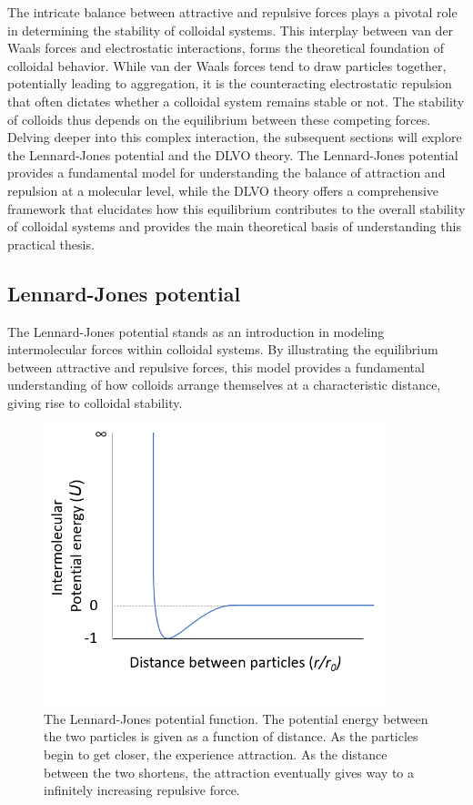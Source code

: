 The intricate balance between attractive and repulsive forces plays a pivotal role in determining the stability of colloidal systems. This interplay between van der Waals forces and electrostatic interactions, forms the theoretical foundation of colloidal behavior. While van der Waals forces tend to draw particles together, potentially leading to aggregation, it is the counteracting electrostatic repulsion that often dictates whether a colloidal system remains stable or not. The stability of colloids thus depends on the equilibrium between these competing forces. Delving deeper into this complex interaction, the subsequent sections will explore the Lennard-Jones potential and the DLVO theory. The Lennard-Jones potential provides a fundamental model for understanding the balance of attraction and repulsion at a molecular level, while the DLVO theory offers a comprehensive framework that elucidates how this equilibrium contributes to the overall stability of colloidal systems and provides the main theoretical basis of understanding this practical thesis.

\subsection{Lennard-Jones potential} %

The Lennard-Jones potential stands as an introduction in modeling intermolecular forces within colloidal systems. By illustrating the equilibrium between attractive and repulsive forces, this model provides a fundamental understanding of how colloids arrange themselves at a characteristic distance, giving rise to colloidal stability.

\begin{figure}[h!!]     %
        \begin{center}
          \includegraphics[width=100mm]{chapter1/Lennard's potato.PNG}
\end{center}
\caption{The Lennard-Jones potential function. The potential energy between the two particles is given as a function of distance. As the particles begin to get closer, the experience attraction. As the distance between the two shortens, the attraction eventually gives way to a infinitely increasing repulsive force.}
\label{fig:potato}                 %
\end{figure}

